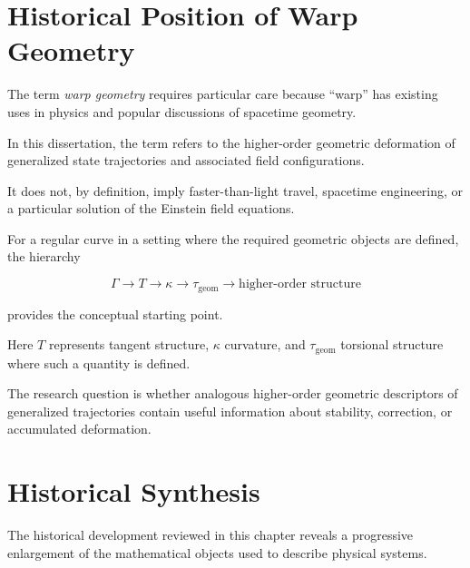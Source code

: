 \documentclass[12pt,oneside]{book}
\begin{document}

\section{Historical Position of Warp Geometry}
\label{sec:historical-position-warp}

The term \emph{warp geometry} requires particular care because
``warp'' has existing uses in physics and popular discussions of
spacetime geometry.

In this dissertation, the term refers to the higher-order
geometric deformation of generalized state trajectories and
associated field configurations.

It does not, by definition, imply faster-than-light travel,
spacetime engineering, or a particular solution of the Einstein
field equations.

For a regular curve in a setting where the required geometric
objects are defined, the hierarchy

\begin{equation}
    \Gamma
    \longrightarrow
    T
    \longrightarrow
    \kappa
    \longrightarrow
    \tau_{\mathrm{geom}}
    \longrightarrow
    \text{higher-order structure}
    \label{eq:warp-hierarchy}
\end{equation}

provides the conceptual starting point.

Here \(T\) represents tangent structure,
\(\kappa\) curvature, and
\(\tau_{\mathrm{geom}}\) torsional structure where such a
quantity is defined.

The research question is whether analogous higher-order
geometric descriptors of generalized trajectories contain
useful information about stability, correction, or accumulated
deformation.


\section{Historical Synthesis}
\label{sec:historical-synthesis}

The historical development reviewed in this chapter reveals a
progressive enlargement of the mathematical objects used to
describe physical systems.
\end{document}
